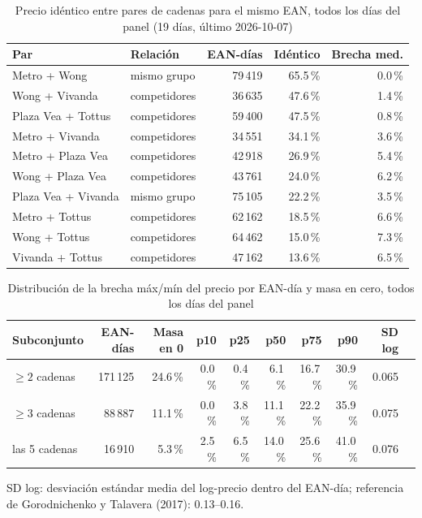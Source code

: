 
\begin{table}[htbp]
\caption{Precio id\'entico entre pares de cadenas para el mismo EAN, todos los d\'ias del panel (19 d\'ias, \'ultimo 2026-10-07)}
\label{tab:identidad}
\centering\scriptsize\setlength{\tabcolsep}{3pt}
\begin{tabular}{@{}llrrr@{}}
\toprule
Par & Relaci\'on & EAN-d\'ias & Id\'entico & Brecha med. \\
\midrule
Metro + Wong & mismo grupo & 79\,419 & 65.5\,\% & 0.0\,\% \\
Wong + Vivanda & competidores & 36\,635 & 47.6\,\% & 1.4\,\% \\
Plaza Vea + Tottus & competidores & 59\,400 & 47.5\,\% & 0.8\,\% \\
Metro + Vivanda & competidores & 34\,551 & 34.1\,\% & 3.6\,\% \\
Metro + Plaza Vea & competidores & 42\,918 & 26.9\,\% & 5.4\,\% \\
Wong + Plaza Vea & competidores & 43\,761 & 24.0\,\% & 6.2\,\% \\
Plaza Vea + Vivanda & mismo grupo & 75\,105 & 22.2\,\% & 3.5\,\% \\
Metro + Tottus & competidores & 62\,162 & 18.5\,\% & 6.6\,\% \\
Wong + Tottus & competidores & 64\,462 & 15.0\,\% & 7.3\,\% \\
Vivanda + Tottus & competidores & 47\,162 & 13.6\,\% & 6.5\,\% \\
\bottomrule\end{tabular}\end{table}

\begin{table}[t]
\caption{Distribuci\'on de la brecha m\'ax/m\'in del precio por EAN-d\'ia y masa en cero, todos los d\'ias del panel}
\label{tab:brecha}
\centering\scriptsize\setlength{\tabcolsep}{4pt}
\begin{tabular}{@{}lrrrrrrrrr@{}}
\toprule
Subconjunto & EAN-d\'ias & Masa en 0 & p10 & p25 & p50 & p75 & p90 & SD log \\
\midrule
$\geq 2$ cadenas & 171\,125 & 24.6\,\% & 0.0\,\% & 0.4\,\% & 6.1\,\% & 16.7\,\% & 30.9\,\% & 0.065 \\
$\geq 3$ cadenas & 88\,887 & 11.1\,\% & 0.0\,\% & 3.8\,\% & 11.1\,\% & 22.2\,\% & 35.9\,\% & 0.075 \\
las 5 cadenas & 16\,910 & 5.3\,\% & 2.5\,\% & 6.5\,\% & 14.0\,\% & 25.6\,\% & 41.0\,\% & 0.076 \\
\bottomrule\end{tabular}
\par\smallskip\raggedright\scriptsize SD log: desviaci\'on est\'andar media del log-precio dentro del EAN-d\'ia; referencia de Gorodnichenko y Talavera (2017): 0.13--0.16.
\end{table}

